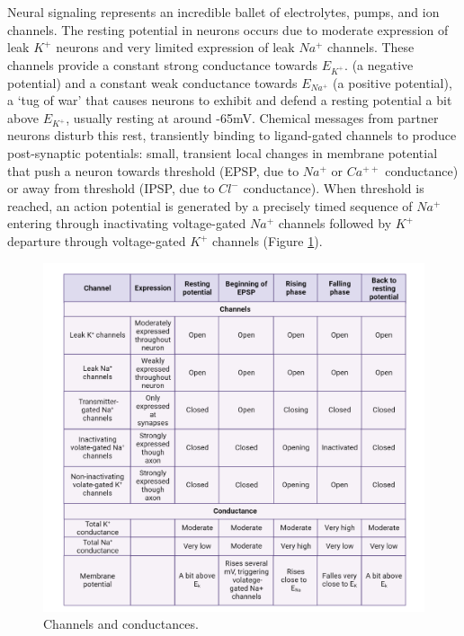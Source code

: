 \documentclass[
]{book}
\begin{document}
Neural signaling represents an incredible ballet of electrolytes, pumps, and ion channels. The resting potential in neurons occurs due to moderate expression of leak \(K^+\) neurons and very limited expression of leak \(Na^+\) channels. These channels provide a constant strong conductance towards \(E_{K^+}\). (a negative potential) and a constant weak conductance towards \(E_{Na^+}\) (a positive potential), a `tug of war' that causes neurons to exhibit and defend a resting potential a bit above \(E_{K^+}\), usually resting at around -65mV. Chemical messages from partner neurons disturb this rest, transiently binding to ligand-gated channels to produce post-synaptic potentials: small, transient local changes in membrane potential that push a neuron towards threshold (EPSP, due to \(Na^+\) or \(Ca^{++}\) conductance) or away from threshold (IPSP, due to \(Cl^{-}\) conductance). When threshold is reached, an action potential is generated by a precisely timed sequence of \(Na^+\) entering through inactivating voltage-gated \(Na^+\) channels followed by \(K^+\) departure through voltage-gated \(K^+\) channels (Figure \ref{fig:channels-and-conductances-table}).

\begin{figure}

{\centering \includegraphics[width=0.9\linewidth]{images/ch02/table_02_04} 

}

\caption{Channels and conductances.}\label{fig:channels-and-conductances-table}
\end{figure}
\end{document}
